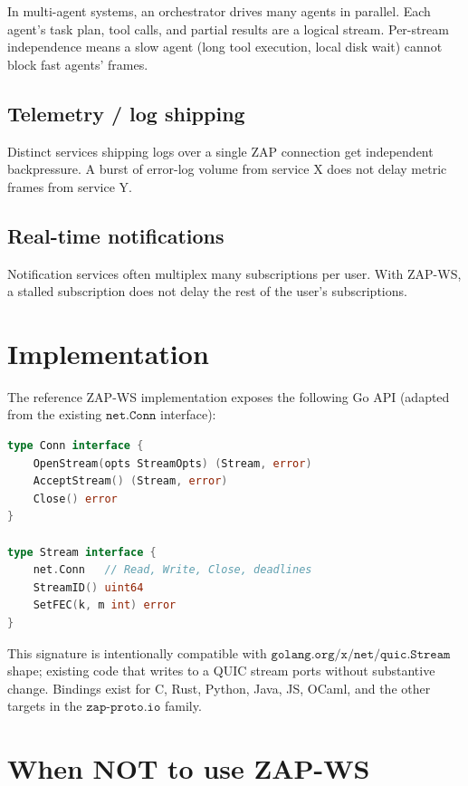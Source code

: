 \documentclass[11pt,a4paper]{article}
\begin{document}
In multi-agent systems, an orchestrator drives many agents in parallel.
Each agent's task plan, tool calls, and partial results are a logical
stream. Per-stream independence means a slow agent (long tool execution,
local disk wait) cannot block fast agents' frames.

\subsection{Telemetry / log shipping}

Distinct services shipping logs over a single ZAP connection get
independent backpressure. A burst of error-log volume from service X does
not delay metric frames from service Y.

\subsection{Real-time notifications}

Notification services often multiplex many subscriptions per user. With
ZAP-WS, a stalled subscription does not delay the rest of the user's
subscriptions.

\section{Implementation}

The reference ZAP-WS implementation exposes the following Go API
(adapted from the existing $\texttt{net.Conn}$ interface):

\begin{lstlisting}[language=Go, basicstyle=\small\ttfamily]
type Conn interface {
    OpenStream(opts StreamOpts) (Stream, error)
    AcceptStream() (Stream, error)
    Close() error
}

type Stream interface {
    net.Conn   // Read, Write, Close, deadlines
    StreamID() uint64
    SetFEC(k, m int) error
}
\end{lstlisting}

This signature is intentionally compatible with $\texttt{golang.org/x/net/quic.Stream}$
shape; existing code that writes to a QUIC stream ports without
substantive change. Bindings exist for C, Rust, Python, Java, JS,
OCaml, and the other targets in the $\texttt{zap-proto.io}$ family.

\section{When NOT to use ZAP-WS}
\end{document}
